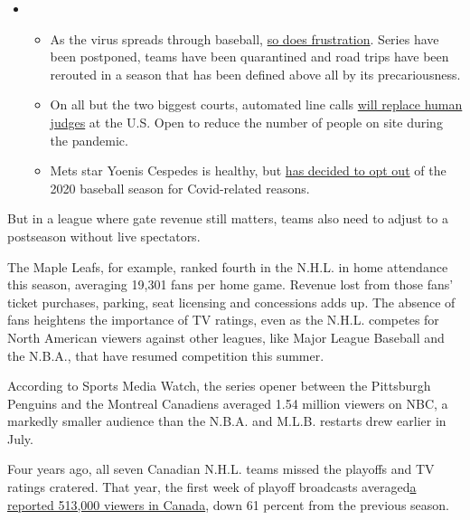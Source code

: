 \begin{itemize}
\item
  \begin{itemize}
  \tightlist
  \item
    As the virus spreads through baseball,
    \href{https://www.nytimes3xbfgragh.onion/2020/08/03/sports/baseball/mlb-coronavirus-outbreak.html?action=click\&pgtype=Article\&state=default\&region=MAIN_CONTENT_2\&context=storylines_keepup}{so
    does frustration}. Series have been postponed, teams have been
    quarantined and road trips have been rerouted in a season that has
    been defined above all by its precariousness.
  \item
    On all but the two biggest courts, automated line calls
    \href{https://www.nytimes3xbfgragh.onion/2020/08/03/sports/tennis/us-open-hawkeye-line-judges.html?action=click\&pgtype=Article\&state=default\&region=MAIN_CONTENT_2\&context=storylines_keepup}{will
    replace human judges} at the U.S. Open to reduce the number of
    people on site during the pandemic.
  \item
    Mets star Yoenis Cespedes is healthy, but
    \href{https://www.nytimes3xbfgragh.onion/2020/08/02/sports/baseball/Yoenis-cespedes-opt-out-rule.html?action=click\&pgtype=Article\&state=default\&region=MAIN_CONTENT_2\&context=storylines_keepup}{has
    decided to opt out} of the 2020 baseball season for Covid-related
    reasons.
  \end{itemize}
\end{itemize}

But in a league where gate revenue still matters, teams also need to
adjust to a postseason without live spectators.

The Maple Leafs, for example, ranked fourth in the N.H.L. in home
attendance this season, averaging 19,301 fans per home game. Revenue
lost from those fans' ticket purchases, parking, seat licensing and
concessions adds up. The absence of fans heightens the importance of TV
ratings, even as the N.H.L. competes for North American viewers against
other leagues, like Major League Baseball and the N.B.A., that have
resumed competition this summer.

According to Sports Media Watch, the series opener between the
Pittsburgh Penguins and the Montreal Canadiens averaged 1.54 million
viewers on NBC, a markedly smaller audience than the N.B.A. and M.L.B.
restarts drew earlier in July.

Four years ago, all seven Canadian N.H.L. teams missed the playoffs and
TV ratings cratered. That year, the first week of playoff broadcasts
averaged\href{https://thehockeynews.com/news/article/playoff-tv-ratings-down-a-shocking-61-percent-in-canada}{a
reported 513,000 viewers in Canada}, down 61 percent from the previous
season.

